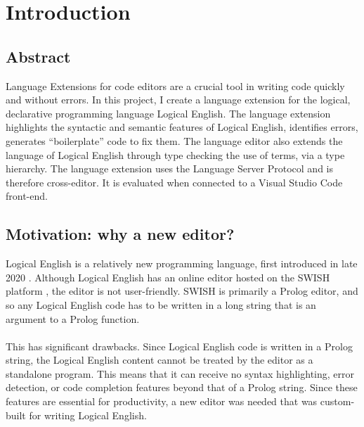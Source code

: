 \documentclass[../main.tex]{subfiles}
\begin{document}
\chapter{Introduction}
\section{Abstract}
Language Extensions for code editors are a crucial tool in writing code quickly and without errors. In this project, I create a language extension for the logical, declarative programming language Logical English. The language extension highlights the syntactic and semantic features of Logical English, identifies errors, generates ``boilerplate'' code to fix them. The language editor also extends the language of Logical English through type checking the use of terms, via a type hierarchy. The language extension uses the Language Server Protocol and is therefore cross-editor. It is evaluated when connected to a Visual Studio Code front-end.

\section{Motivation: why a new editor?}
Logical English is a relatively new programming language, first introduced in late 2020 \cite{logical_english} . Although Logical English has an online editor hosted on the SWISH platform \cite{swish_editor}, the editor is not user-friendly. SWISH is primarily a Prolog editor, and so any Logical English code has to be written in a long string that is an argument to a Prolog function. 
\\ 
\\ 
This has significant drawbacks. Since Logical English code is written in a Prolog string, the Logical English content cannot be treated by the editor as a standalone program. This means that it can receive no syntax highlighting, error detection, or code completion features beyond that of a Prolog string. Since these features are essential for productivity, a new editor was needed that was custom-built for writing Logical English.
\end{document}
